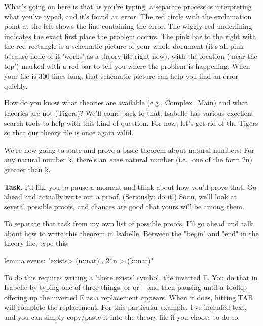 What's going on here is that as you're typing, a separate process is interpreting what you've typed, and it's found an error. The red circle with the exclamation point at the left shows the line containing the error. The wiggly red underlining indicates the exact first place the problem occurs. The pink bar to the right with the red rectangle is a schematic picture of your whole document (it's all pink because none of it 'works' as a theory file right now), with the location ('near the top') marked with a red bar to tell you where the problem is happening. When your file is 300 lines long, that schematic picture can help you find an error quickly. 

How do you know what theories are available (e.g., Complex\_Main) and what theories are not (Tigers)? We'll come back to that. Isabelle has various excellent search tools to help with this kind of question. For now, let's get rid of the Tigers so that our theory file is once again valid. 

We're now going to state and prove a basic theorem about natural numbers: For any natural number k, there's an \textit{even} natural number (i.e., one of the form 2n) greater than k. 

\textbf{Task}. I'd like you to pause a moment and think about how you'd prove that. Go ahead and actually write out a proof. (Seriously: do it!) Soon, we'll look at several possible proofs, and chances are good that yours will be among them. 

To separate that task from my own list of possible proofs, I'll go ahead and talk about how to write this theorem in Isabelle. Between the "begin" and "end" in the theory file, type this: 
\begin{IS}
lemma evens: "\<exists> (n::nat) . 2*n > (k::nat)"
\end{IS}
To do this requires writing a 'there exists' symbol, the inverted E. You do that in Isabelle by typing one of three things:  or  or \isi{\exists} -- and then pausing until a tooltip offering up the inverted E as a replacement appears. When it does, hitting TAB will complete the replacement. For this particular example, I've included text, and you can simply copy/paste it into the theory file if you choose to do so.

